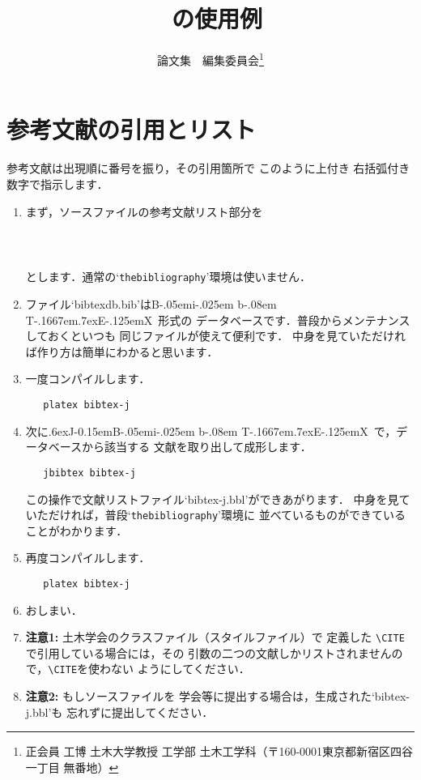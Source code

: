 \documentclass[dvipdfmx]{jsce}
\title{\BibTeX\ の使用例}
\author{論文集　編集委員会\thanks{正会員 工博 土木大学教授 工学部
土木工学科（〒160-0001東京都新宿区四谷一丁目
無番地）\email{your_name@foo.ac.jp}}}
\def\BibTeX{{\rm B\kern-.05em{\sc i\kern-.025em b}\kern-.08em
    T\kern-.1667em\lower.7ex\hbox{E}\kern-.125emX}}
\def\JBibTeX{\leavevmode\lower .6ex\hbox{J}\kern-0.15em\BibTeX}
\begin{document}
\maketitle

\section{参考文献の引用とリスト}

参考文献は出現順に番号を振り，その引用箇所で
このように\cite{Asaro,antmanrod}上付き
右括弧付き数字\cite{hillbook}で指示します．

\begin{enumerate}
\item まず，ソースファイルの参考文献リスト部分を
\begin{verbatim}
   
   
\end{verbatim}
とします．通常の`{\tt thebibliography}'環境は使いません．
\item ファイル`bibtexdb.bib'は\BibTeX\ 形式の
データベースです．普段からメンテナンスしておくといつも
同じファイルが使えて便利です．
中身を見ていただければ作り方は簡単にわかると思います．
\lastpagecontrol[1cm]{6.5cm}
\item 一度コンパイルします．
\begin{verbatim}
   platex bibtex-j
\end{verbatim}
\item 次に\JBibTeX\ で，データベースから該当する
文献を取り出して成形します．
\begin{verbatim}
   jbibtex bibtex-j
\end{verbatim}
この操作で文献リストファイル`bibtex-j.bbl'ができあがります．
中身を見ていただければ，普段`{\tt thebibliography}'環境に
並べているものができていることがわかります．
\item 再度コンパイルします．
\begin{verbatim}
   platex bibtex-j
\end{verbatim}
\item おしまい．
\item {\bf 注意1:} 土木学会のクラスファイル（スタイルファイル）で
定義した \verb+\CITE+で引用している場合には，その
引数の二つの文献しかリストされませんので，\verb+\CITE+を使わない
ようにしてください．
\item {\bf 注意2:} もしソースファイルを
学会等に提出する場合は，生成された`bibtex-j.bbl'も
忘れずに提出してください．
\end{enumerate}




\lastpagesettings
\end{document}
